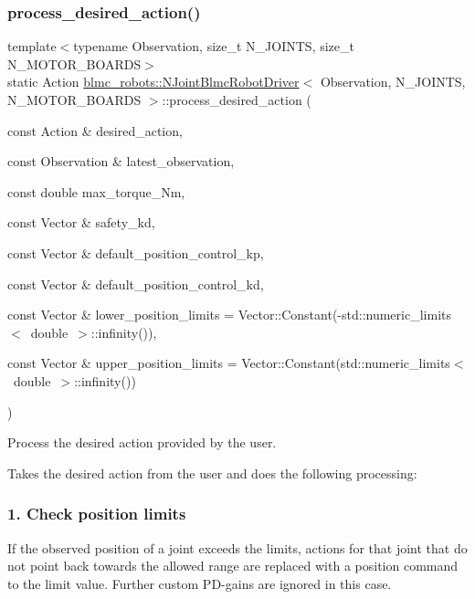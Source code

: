\subsubsection{\texorpdfstring{process\+\_\+desired\+\_\+action()}{process\_desired\_action()}}
{\footnotesize\ttfamily template$<$typename Observation, size\+\_\+t N\+\_\+\+J\+O\+I\+N\+TS, size\+\_\+t N\+\_\+\+M\+O\+T\+O\+R\+\_\+\+B\+O\+A\+R\+DS$>$ \\
static Action \hyperlink{classblmc__robots_1_1NJointBlmcRobotDriver}{blmc\+\_\+robots\+::\+N\+Joint\+Blmc\+Robot\+Driver}$<$ Observation, N\+\_\+\+J\+O\+I\+N\+TS, N\+\_\+\+M\+O\+T\+O\+R\+\_\+\+B\+O\+A\+R\+DS $>$\+::process\+\_\+desired\+\_\+action (\begin{DoxyParamCaption}\item[{const Action \&}]{desired\+\_\+action,  }\item[{const Observation \&}]{latest\+\_\+observation,  }\item[{const double}]{max\+\_\+torque\+\_\+\+Nm,  }\item[{const Vector \&}]{safety\+\_\+kd,  }\item[{const Vector \&}]{default\+\_\+position\+\_\+control\+\_\+kp,  }\item[{const Vector \&}]{default\+\_\+position\+\_\+control\+\_\+kd,  }\item[{const Vector \&}]{lower\+\_\+position\+\_\+limits = {\ttfamily Vector\+:\+:Constant(-\/std\+:\+:numeric\+\_\+limits$<$~double~$>$\+:\+:infinity())},  }\item[{const Vector \&}]{upper\+\_\+position\+\_\+limits = {\ttfamily Vector\+:\+:Constant(std\+:\+:numeric\+\_\+limits$<$~double~$>$\+:\+:infinity())} }\end{DoxyParamCaption})\hspace{0.3cm}{\ttfamily [static]}}



Process the desired action provided by the user. 

Takes the desired action from the user and does the following processing\+:

\subsubsection*{1. Check position limits}

If the observed position of a joint exceeds the limits, actions for that joint that do not point back towards the allowed range are replaced with a position command to the limit value. Further custom P\+D-\/gains are ignored in this case.

